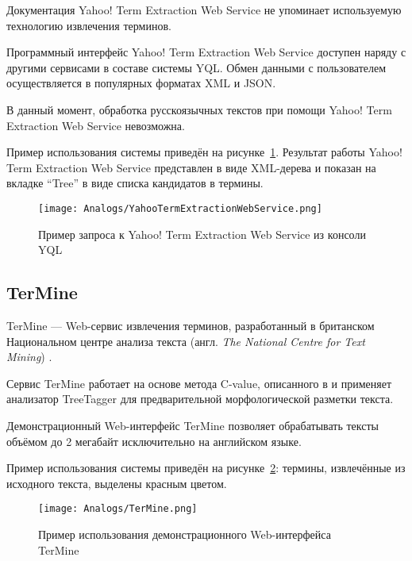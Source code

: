 Документация Yahoo! Term Extraction Web Service не упоминает
используемую технологию извлечения терминов.

Программный интерфейс Yahoo! Term Extraction Web Service доступен
наряду с другими сервисами в составе системы YQL. Обмен данными
с пользователем осуществляется в популярных форматах XML и JSON.

В данный момент, обработка русскоязычных текстов при помощи
Yahoo! Term Extraction Web Service невозможна.

Пример использования системы приведён на
рисунке~\ref{fig:Analogs:YahooTermExtractionWebService}. Результат
работы Yahoo! Term Extraction Web Service представлен в виде
XML-дерева и показан на вкладке “Tree” в виде списка кандидатов в
термины.

\begin{landscape}
\begin{figure}[ht]
  \centering
  \texttt{[image: Analogs/YahooTermExtractionWebService.png]}
  \caption{Пример запроса к Yahoo! Term Extraction Web Service
из консоли YQL}
  \label{fig:Analogs:YahooTermExtractionWebService}
\end{figure}
\end{landscape}

\subsection{TerMine}
\label{subsec:TerMine}
TerMine — Web-сервис извлечения терминов, разработанный в
британском Национальном центре анализа текста (англ.
\emph{The National Centre for Text Mining}) \cite{TerMine}.

Сервис TerMine работает на основе метода C-value, описанного в
\cite{Frantzi00} и применяет анализатор TreeTagger \cite{TreeTagger}
для предварительной морфологической разметки текста.

Демонстрационный Web-интерфейс TerMine позволяет обрабатывать
тексты объёмом до 2 мегабайт исключительно на английском языке.

Пример использования системы приведён на
рисунке~\ref{fig:Analogs:TerMine}: термины, извлечённые из исходного
текста, выделены красным цветом.

\begin{landscape}
\begin{figure}[ht]
  \centering
  \texttt{[image: Analogs/TerMine.png]}
  \caption{Пример использования демонстрационного Web-интерфейса
TerMine}
  \label{fig:Analogs:TerMine}
\end{figure}
\end{landscape}

